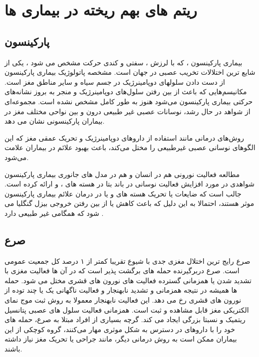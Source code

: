 
\section{ ریتم های بهم ریخته در بیماری ها}

\subsection{پارکینسون}
بیماری پارکینسون  ، که با لرزش ، سفتی و کندی حرکت مشخص می شود ، یکی از شایع ترین اختلالات تخریب عصبی در جهان است. مشخصه پاتولوژیک بیماری پارکینسون از دست دادن سلولهای دوپامینرژیک در جسم سیاه
و سایر مناطق مغز است.
مکانیسم‌هایی که باعث از بین رفتن سلول‌های دوپامینرژیک و منجر به بروز نشانه‌های حرکتی بیماری پارکینسون می‌شود هنوز به طور کامل مشخص نشده است. مجموعه‌ای از شواهد در حال رشد، نوسانات عصبی غیر طبیعی درون و بین نواحی مختلف مغز در بیماران پارکینسونی نشان می دهد. 

 روش‌های درمانی مانند استفاده از داروهای دوپامینرژیک و تحریک عمقی مغز که این الگوهای نوسانی عصبی غیرطبیعی را مختل می‌کند، باعث بهبود علائم در بیماران علامت می‌شود.

مطالعه فعالیت نورونی هم در انسان و هم در مدل های جانوری بیماری پارکینسون شواهدی در مورد افزایش فعالیت نوسانی در باند بتا در هسته های 
، 
و 
ارائه کرده است. جالب است که ضایعات یا تحریک هسته های 
 و یا
در درمان علائم بیماری پارکینسون موثر هستند، احتمالا به این دلیل که باعث کاهش یا از بین رفتن خروجی بیزل گنگلیا می شود که همگامی غیر طبیعی دارد
\cite{chen2011stimulation, moro2002impact, jenkinson2011new, hammond2007pathological}
.
\subsection{صرع}
صرع رایج ترین اختلال مغزی جدی با شیوع تقریبا کمتر از ۱ درصد کل جمعیت عمومی است.
صرع دربرگیرنده حمله های برگشت پذیر است که در آن ها فعالیت مغزی با تشدید شدن یا همزمانی گسترده فعالیت های نورون های قشری
مختل می شود. 
حمله ها همیشه در نتیجه همزمانی و تشدید نابهنجار و فعالیت ناگهانی یک یا چند توده از نورون های قشری رخ می دهد. این فعالیت نابهنجار معمولا به روش ثبت موج نمای الکتریکی مغز
قابل مشاهده و ثبت است. همزمانی فعالیت سلول های عصبی پتانسیل ریتمیک و نسبتا بزرگی ایجاد می کند. گرچه بسیاری از افراد مبتلا به صرع، حمله های خود را با داروهای در دسترس به شکل موثری مهار می‌کنند، گروه کوچکی از این بیماران ممکن است به روش درمانی دیگر، مانند جراحی یا تحریک مغز نیاز داشته باشند.

